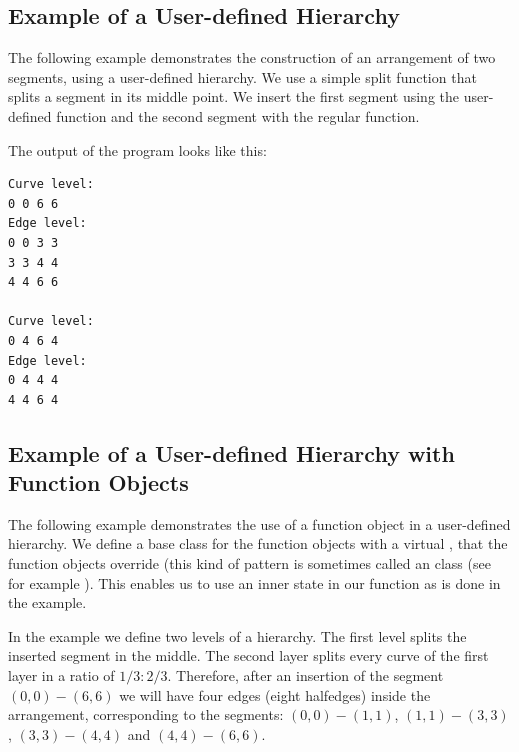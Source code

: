 \begin{itemize}
\begin{ccAdvanced}
\subsection{Example of a User-defined Hierarchy}
\label{ssec:example4}

The following example demonstrates the construction of an
arrangement of two segments, using a user-defined
hierarchy.
We use a simple split function that splits a segment in its middle
point. We insert the first segment using the user-defined function
and the second segment with the regular function.


The output of the program looks like this:
\begin{verbatim}
Curve level:
0 0 6 6
Edge level:
0 0 3 3
3 3 4 4
4 4 6 6

Curve level:
0 4 6 4
Edge level:
0 4 4 4
4 4 6 4
\end{verbatim}

\end{ccAdvanced}


\begin{ccAdvanced}

\subsection{Example of a User-defined Hierarchy with Function Objects}
\label{ssec:example5}

The following example demonstrates the use of a function object in
a user-defined hierarchy. We define a base class for the function objects
with a virtual , that the function objects override (this
kind of pattern is sometimes called an  class
(see for example \cite[Chapter~25.5]{cgal:s-cpl-97}). This enables us to
use an inner state in our function as is done in the example.

In the example we define two levels of a hierarchy. The first level
splits the inserted segment in the middle. The second layer splits every
curve of the first layer in a ratio of $1/3 : 2/3$. Therefore, after
an insertion of the segment $(0,0) - (6,6)$
we will have four edges (eight halfedges)
inside the arrangement, corresponding to the segments: $(0,0) - (1,1)$,
$(1,1) - (3,3)$, $(3,3) - (4,4)$ and $(4,4) - (6,6)$.


\end{ccAdvanced}


\end{itemize}
